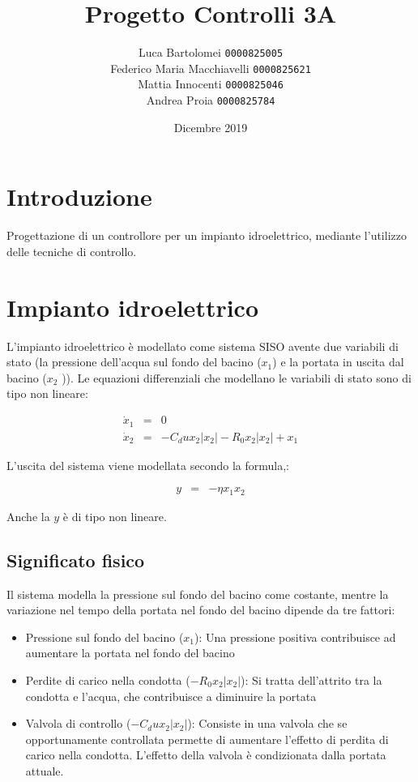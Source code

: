 \documentclass{article}
\title{Progetto Controlli 3A}
\author{
    Luca Bartolomei 
    \texttt{0000825005}
    \\
    Federico Maria Macchiavelli 
    \texttt{0000825621}
    \\
    Mattia Innocenti 
    \texttt{0000825046}
    \\
    Andrea Proia 
    \texttt{0000825784}
}
\date{Dicembre 2019}
\begin{document}
\maketitle

\section{Introduzione}

Progettazione di un controllore per un impianto idroelettrico, mediante l'utilizzo delle tecniche di controllo.

\section{Impianto idroelettrico}

L'impianto idroelettrico è modellato come sistema SISO avente due variabili di stato (la pressione  dell’acqua sul fondo del bacino ($x_1$) e la portata in uscita dal bacino ($x_2$ )). Le equazioni differenziali che modellano le variabili di stato sono di tipo non lineare:

$$
\begin{array}{lcl}
    \dot{x}_1 & = & 0 \\
    \dot{x}_2 & = & -C_d u x_2 |x_2| -R_0 x_2 |x_2| + x_1
\end{array}
$$

L'uscita del sistema viene modellata secondo la formula,:

$$
\begin{array}{lcl}
    y & = & -\eta x_1 x_2
\end{array}
$$

Anche la $y$ è di tipo non lineare.

\subsection{Significato fisico}

Il sistema modella la pressione sul fondo del bacino come costante, mentre la variazione nel tempo della portata nel fondo del bacino dipende da tre fattori:

\begin{itemize}
    \item Pressione sul fondo del bacino ($x_1$): Una pressione positiva contribuisce ad aumentare la portata nel fondo del bacino
    \item Perdite di carico nella condotta ($-R_0 x_2 |x_2|$): Si tratta dell'attrito tra la condotta e l'acqua, che contribuisce a diminuire la portata
    \item Valvola di controllo ($-C_d u x_2 |x_2|$): Consiste in una valvola che se opportunamente controllata permette di aumentare l'effetto di perdita di carico nella condotta. L'effetto della valvola è condizionata dalla portata attuale.
\end{itemize}
\end{document}
